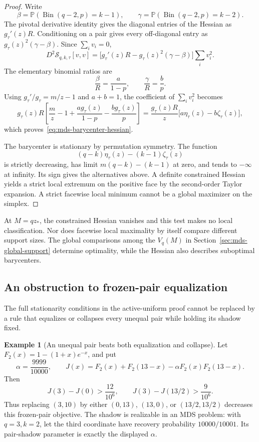 \documentclass[11pt]{article}
\theoremstyle{definition}
\newtheorem{example}[theorem]{Example}
\theoremstyle{remark}
\DeclareMathOperator{\Bin}{Bin}
\newcommand{\Pbb}{\mathbb P}
\newcommand{\1}{\mathbf 1}
\begin{document}
\begin{proof}
Write
\[
  \beta=\Pbb(\Bin(q-2,p)=k-1),\qquad
  \gamma=\Pbb(\Bin(q-2,p)=k-2).
\]
The pivotal derivative identity gives the diagonal entries of the
Hessian as \(g_\tau'(z)R\).  Conditioning on a pair gives every
off-diagonal entry as \(g_\tau(z)^2(\gamma-\beta)\).
Since \(\sum_i v_i=0\),
\[
  D^2\mathcal S_{q,k,\tau}[v,v]
  =\bigl[g_\tau'(z)R-g_\tau(z)^2(\gamma-\beta)\bigr]
    \sum_i v_i^2.
\]
The elementary binomial ratios are
\[
  \frac\beta R=\frac{a}{1-p},\qquad
  \frac\gamma R=\frac b p.
\]
Using \(g_\tau'/g_\tau=m/z-1\) and \(a+b=1\), the coefficient
of \(\sum_i v_i^2\) becomes
\[
  g_\tau(z)R
  \left[\frac mz-1+\frac{a g_\tau(z)}{1-p}
                    -\frac{b g_\tau(z)}p\right]
  =\frac{g_\tau(z)R}{z}
    \bigl[a\eta_\tau(z)-b\zeta_\tau(z)\bigr],
\]
which proves~\eqref{eq:mds-barycenter-hessian}.

The barycenter is stationary by permutation symmetry.  The function
\[
  (q-k)\eta_\tau(z)-(k-1)\zeta_\tau(z)
\]
is strictly decreasing, has limit
\(m(q-k)-(k-1)\) at zero, and tends to \(-\infty\) at infinity.
Its sign gives the alternatives above.  A definite constrained
Hessian yields a strict local extremum on the positive face by the
second-order Taylor expansion.  A strict facewise local minimum
cannot be a global maximizer on the simplex.
\end{proof}

At \(M=qz_*\), the constrained Hessian vanishes and this test makes
no local classification.  Nor does facewise local maximality by
itself compare different support sizes. The global comparisons among
the \(V_q(M)\) in Section~\ref{sec:mds-global-support} determine
optimality, while the Hessian also describes suboptimal barycenters.

\subsection{An obstruction to frozen-pair equalization}

The full stationarity conditions in the active-uniform proof cannot
be replaced by a rule that equalizes or collapses every unequal
pair while holding its shadow fixed.

\begin{example}[An unequal pair beats both equalization and collapse]
\label{ex:mds-frozen-pair}
Let \(F_2(x)=1-(1+x)e^{-x}\), and put
\[
  \alpha=\frac{9999}{10000},\qquad
  J(x)=F_2(x)+F_2(13-x)-\alpha F_2(x)F_2(13-x).
\]
Then
\begin{equation}\label{eq:mds-frozen-pair-signs}
  J(3)-J(0)>\frac{12}{10^6},\qquad
  J(3)-J(13/2)>\frac9{10^6}.
\end{equation}
Thus replacing \((3,10)\) by either \((0,13)\), \((13,0)\), or
\((13/2,13/2)\) decreases this frozen-pair objective.  The shadow
is realizable in an MDS problem: with \(q=3,k=2\), let the third
coordinate have recovery probability \(10000/10001\).  Its
pair-shadow parameter is exactly the displayed \(\alpha\).
\end{example}
\end{document}
